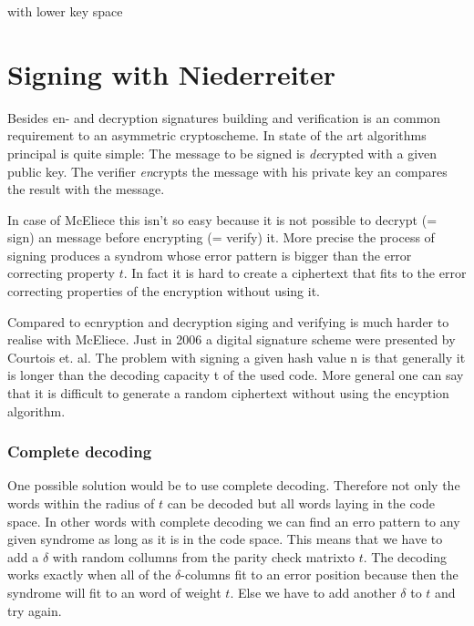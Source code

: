 

with lower key space



\section{Signing with Niederreiter}
\label{signature}
Besides en- and decryption signatures building and verification is an common requirement to an asymmetric cryptoscheme. In state of the art algorithms principal is quite simple: The message to be signed is \textit{de}crypted with a given public key. The verifier \textit{en}crypts the message with his private key an compares the result with the message. 

In case of McEliece this isn't so easy because it is not possible to decrypt (= sign) an message before encrypting (= verify) it. More precise the process of signing produces a syndrom whose  error pattern is bigger than the error correcting property $t$. In fact it is hard to create a ciphertext that fits to the error correcting properties of the encryption without using it. 


Compared to ecnryption and decryption siging and verifying is much harder to realise with McEliece. Just in 2006 a digital signature scheme were presented by Courtois et. al. 
The problem with signing a given hash value n is that generally it is longer than the decoding capacity t of the used code. More general one can say that it is difficult to generate a random ciphertext without using the encyption algorithm. \cite{courtois2001achieve}


\subsubsection*{Complete decoding}
One possible solution would be to use complete decoding. Therefore not only the words within the radius of $t$ can be decoded but all words laying in the code space. In other words with complete decoding we can find an erro pattern to any given syndrome as long as it is in the code space. This means that we have to add a $\delta$ with random collumns from the parity check matrixto $t$. The decoding works exactly when all of the $\delta$-columns fit to an error position because then the syndrome will fit to an word of weight $t$. Else we have to add another $\delta$ to $t$ and try again.

